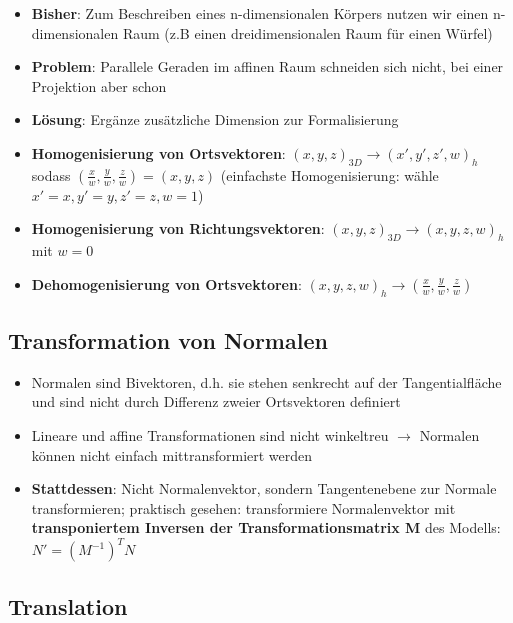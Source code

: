 \documentclass[10pt,a4paper]{article}
\begin{document}
	\begin{itemize}
		\item \textbf{Bisher}: Zum Beschreiben eines n-dimensionalen Körpers nutzen wir einen n-dimensionalen Raum (z.B einen dreidimensionalen Raum für einen Würfel)
		\item \textbf{Problem}: Parallele Geraden im affinen Raum schneiden sich nicht, bei einer Projektion aber schon
		\item \textbf{Lösung}: Ergänze zusätzliche Dimension zur Formalisierung
		\item \textbf{Homogenisierung von Ortsvektoren}: $(x, y, z)_{3D} \rightarrow (x', y', z', w)_h$ sodass $(\frac{x}{w}, \frac{y}{w}, \frac{z}{w}) = (x, y, z)$ (einfachste Homogenisierung: wähle $x' = x, y' = y, z' = z, w = 1$)
		\item \textbf{Homogenisierung von Richtungsvektoren}: $(x, y, z)_{3D} \rightarrow (x, y, z, w)_h$ mit $w = 0$
		\item \textbf{Dehomogenisierung von Ortsvektoren}: $(x, y, z, w)_h \rightarrow (\frac{x}{w}, \frac{y}{w}, \frac{z}{w})$
	\end{itemize}

	\subsection{Transformation von Normalen}
	\label{tf:sub:transformation_von_normalen}

	\begin{itemize}
		\item Normalen sind Bivektoren, d.h. sie stehen senkrecht auf der Tangentialfläche und sind nicht durch Differenz zweier Ortsvektoren definiert
		\item Lineare und affine Transformationen sind nicht winkeltreu $\rightarrow$ Normalen können nicht einfach mittransformiert werden
		\item \textbf{Stattdessen}: Nicht Normalenvektor, sondern Tangentenebene zur Normale transformieren; praktisch gesehen: transformiere Normalenvektor mit \textbf{transponiertem Inversen der Transformationsmatrix M} des Modells: $N' = (M^{-1})^T N$
	\end{itemize}

	\newpage
	\subsection{Translation}
	\label{tf:sub:translation}
	
\end{document}
